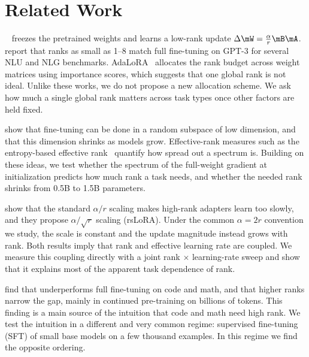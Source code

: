 \section{Related Work}
\label{sec:related}

\lora~\citep{hu2021lora} freezes the pretrained weights and learns a low-rank update $\Delta\mW = \tfrac{\alpha}{r}\mB\mA$. \citet{hu2021lora} report that ranks as small as 1--8 match full fine-tuning on GPT-3 for several NLU and NLG benchmarks. AdaLoRA~\citep{zhang2023adalora} allocates the rank budget across weight matrices using importance scores, which suggests that one global rank is not ideal. Unlike these works, we do not propose a new allocation scheme. We ask how much a single global rank matters across task types once other factors are held fixed.

\citet{aghajanyan2020intrinsic} show that fine-tuning can be done in a random subspace of low dimension, and that this dimension shrinks as models grow. Effective-rank measures such as the entropy-based effective rank~\citep{roy2007effective} quantify how spread out a spectrum is. Building on these ideas, we test whether the spectrum of the full-weight gradient at initialization predicts how much \lora rank a task needs, and whether the needed rank shrinks from 0.5B to 1.5B parameters.

\citet{kalajdzievski2023rslora} show that the standard $\alpha/r$ scaling makes high-rank adapters learn too slowly, and they propose $\alpha/\sqrt{r}$ scaling (rsLoRA). Under the common $\alpha = 2r$ convention we study, the scale is constant and the update magnitude instead grows with rank. Both results imply that rank and effective learning rate are coupled. We measure this coupling directly with a joint rank $\times$ learning-rate sweep and show that it explains most of the apparent task dependence of rank.

\citet{biderman2024lora} find that \lora underperforms full fine-tuning on code and math, and that higher ranks narrow the gap, mainly in continued pre-training on billions of tokens. This finding is a main source of the intuition that code and math need high rank. We test the intuition in a different and very common regime: supervised fine-tuning (SFT) of small base models on a few thousand examples. In this regime we find the opposite ordering.
